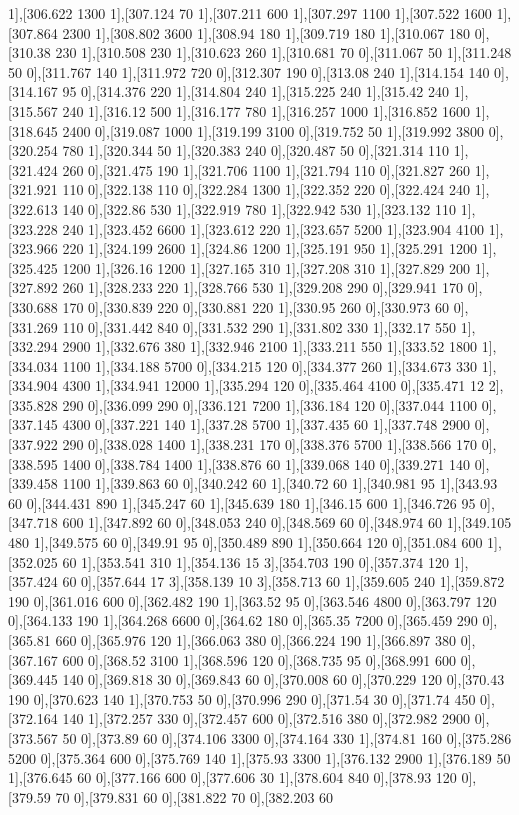 {1],[306.622 1300 1],[307.124 70 1],[307.211 600 1],[307.297 1100 1],[307.522 1600 1],[307.864 2300 1],[308.802 3600 1],[308.94 180 1],[309.719 180 1],[310.067 180 0],[310.38 230 1],[310.508 230 1],[310.623 260 1],[310.681 70 0],[311.067 50 1],[311.248 50 0],[311.767 140 1],[311.972 720 0],[312.307 190 0],[313.08 240 1],[314.154 140 0],[314.167 95 0],[314.376 220 1],[314.804 240 1],[315.225 240 1],[315.42 240 1],[315.567 240 1],[316.12 500 1],[316.177 780 1],[316.257 1000 1],[316.852 1600 1],[318.645 2400 0],[319.087 1000 1],[319.199 3100 0],[319.752 50 1],[319.992 3800 0],[320.254 780 1],[320.344 50 1],[320.383 240 0],[320.487 50 0],[321.314 110 1],[321.424 260 0],[321.475 190 1],[321.706 1100 1],[321.794 110 0],[321.827 260 1],[321.921 110 0],[322.138 110 0],[322.284 1300 1],[322.352 220 0],[322.424 240 1],[322.613 140 0],[322.86 530 1],[322.919 780 1],[322.942 530 1],[323.132 110 1],[323.228 240 1],[323.452 6600 1],[323.612 220 1],[323.657 5200 1],[323.904 4100 1],[323.966 220 1],[324.199 2600 1],[324.86 1200 1],[325.191 950 1],[325.291 1200 1],[325.425 1200 1],[326.16 1200 1],[327.165 310 1],[327.208 310 1],[327.829 200 1],[327.892 260 1],[328.233 220 1],[328.766 530 1],[329.208 290 0],[329.941 170 0],[330.688 170 0],[330.839 220 0],[330.881 220 1],[330.95 260 0],[330.973 60 0],[331.269 110 0],[331.442 840 0],[331.532 290 1],[331.802 330 1],[332.17 550 1],[332.294 2900 1],[332.676 380 1],[332.946 2100 1],[333.211 550 1],[333.52 1800 1],[334.034 1100 1],[334.188 5700 0],[334.215 120 0],[334.377 260 1],[334.673 330 1],[334.904 4300 1],[334.941 12000 1],[335.294 120 0],[335.464 4100 0],[335.471 12 2],[335.828 290 0],[336.099 290 0],[336.121 7200 1],[336.184 120 0],[337.044 1100 0],[337.145 4300 0],[337.221 140 1],[337.28 5700 1],[337.435 60 1],[337.748 2900 0],[337.922 290 0],[338.028 1400 1],[338.231 170 0],[338.376 5700 1],[338.566 170 0],[338.595 1400 0],[338.784 1400 1],[338.876 60 1],[339.068 140 0],[339.271 140 0],[339.458 1100 1],[339.863 60 0],[340.242 60 1],[340.72 60 1],[340.981 95 1],[343.93 60 0],[344.431 890 1],[345.247 60 1],[345.639 180 1],[346.15 600 1],[346.726 95 0],[347.718 600 1],[347.892 60 0],[348.053 240 0],[348.569 60 0],[348.974 60 1],[349.105 480 1],[349.575 60 0],[349.91 95 0],[350.489 890 1],[350.664 120 0],[351.084 600 1],[352.025 60 1],[353.541 310 1],[354.136 15 3],[354.703 190 0],[357.374 120 1],[357.424 60 0],[357.644 17 3],[358.139 10 3],[358.713 60 1],[359.605 240 1],[359.872 190 0],[361.016 600 0],[362.482 190 1],[363.52 95 0],[363.546 4800 0],[363.797 120 0],[364.133 190 1],[364.268 6600 0],[364.62 180 0],[365.35 7200 0],[365.459 290 0],[365.81 660 0],[365.976 120 1],[366.063 380 0],[366.224 190 1],[366.897 380 0],[367.167 600 0],[368.52 3100 1],[368.596 120 0],[368.735 95 0],[368.991 600 0],[369.445 140 0],[369.818 30 0],[369.843 60 0],[370.008 60 0],[370.229 120 0],[370.43 190 0],[370.623 140 1],[370.753 50 0],[370.996 290 0],[371.54 30 0],[371.74 450 0],[372.164 140 1],[372.257 330 0],[372.457 600 0],[372.516 380 0],[372.982 2900 0],[373.567 50 0],[373.89 60 0],[374.106 3300 0],[374.164 330 1],[374.81 160 0],[375.286 5200 0],[375.364 600 0],[375.769 140 1],[375.93 3300 1],[376.132 2900 1],[376.189 50 1],[376.645 60 0],[377.166 600 0],[377.606 30 1],[378.604 840 0],[378.93 120 0],[379.59 70 0],[379.831 60 0],[381.822 70 0],[382.203 60 }
